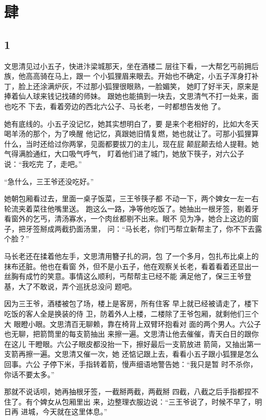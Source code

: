 \section{肆}

{\centering\subsection{1}}

文思清见过小五子，快进汴梁城那天，坐在酒楼二
层往下看，一大帮乞丐前拥后族，他高高骑在马上，跟一
个小狐狸眉来眼去。开始也不确定，小五子浑身打补
丁，脸上还涂满炉灰，不过那小狐狸很眼熟，一脸媚笑，
她盯了好半天，原来是捧着仙人球来钱记找碴的师妹。
跟她也能搞到一块去，文思清气不打一处来，面也吃不
下去，看着旁边的西北六公子、马长老，一时都想告发他
了。

她有底线的。小五子没记忆，她其实想明白了，要
是来个老相好的，比如大冬天喝羊汤的那个，为了唤醒
他记忆，真跟她旧情复燃，她也就让了。可那小狐狸算
什么，当时还给过你两掌，见面都要拔刀的主儿，现在屁
颠屁颠去给人提鞋。她气得满脸通红，大口吸气呼气，
盯着他们进了城门，她放下筷子，对六公子说：“我吃完
了，走吧。”

“急什么，三王爷还没吃好。”

她朝包厢看过去，里面一桌子饭菜，三王爷筷子都
不动一下，两个婢女一左一右轮流夹着菜往他嘴里送。
跑这么一路，净等他吃饭了。她抽出一根牙签，剔着牙
看窗外的乞丐，清汤寡水，一个肉丝都剔不出来。眼不
见为净，她合上这边的窗子，把牙签掰成两截扔面汤里，
问：“马长老，你们丐帮立新帮主了，你不下去露个脸？”

马长老还在揉着他左手，文思清用簪子扎的洞，包
了一个多月，包扎布比桌上的抹布还脏。他也在看窗
外，但不是小五子，他在观察关长老，看着看着还显出一
丝胸有成竹的笑意。事情这么顺利，丐帮帮主已经不能
满足他了，保三王爷登基，大了不敢说，弄个巡抚总没问
题吧。

因为三王爷，酒楼被包了场，楼上是客房，所有住客
早上就已经被请走了，楼下吃饭的客人全是换装的侍
卫，防着外人上楼，二楼除了王爷包厢，就剩他们三个大
眼瞪小眼。文思清百无聊赖，靠在椅背上双臂环抱看对
面的两个男人。六公子也无聊，把箭筒里的每支箭抽出
来擦一遍。文思清让他去催催，青天白日的跟你在这儿
干瞪眼。六公子眼皮都没抬一下，擦好最后一支箭放进
箭简，又抽出第一支箭再擦一遍。文思清又催一次，她
还惦记跟上去，看看小五子跟小狐狸是怎么回事。六公
子停下米，手指转着箭，慢声细语地警告她：“我只是暂
时不杀你，你话不要太多。”

那就不说话呗，她再抽根牙签，一截掰两截，两截掰
四截，八截之后手指都捏不住了。有个婢女从包厢里出
来，边整理衣服边说：“三王爷说了，时候不早了，明日再
进城，今天就在这里体息。”

